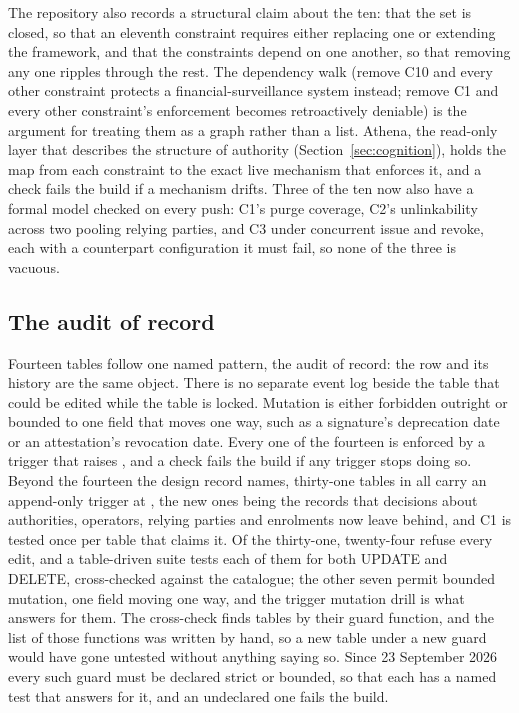 The repository also records a structural claim about the ten: that the set is closed, so that an
eleventh constraint requires either replacing one or extending the framework, and that the
constraints depend on one another, so that removing any one ripples through the rest. The
dependency walk (remove C10 and every other constraint protects a financial-surveillance system
instead; remove C1 and every other constraint's enforcement becomes retroactively deniable) is the
argument for treating them as a graph rather than a list. Athena, the read-only layer that describes the
structure of authority (Section~\ref{sec:cognition}), holds the map from each constraint to the exact live mechanism that enforces it, and a check fails
the build if a mechanism drifts. Three of the ten now also have a formal model checked on every push:
C1's purge coverage, C2's unlinkability across two pooling relying parties, and C3 under concurrent
issue and revoke, each with a counterpart configuration it must fail, so none of the three is vacuous.

\subsection{The audit of record}

Fourteen tables follow one named pattern, the audit of record: the row and its history are the same
object. There is no separate event log beside the table that could be edited while the table is
locked. Mutation is either forbidden outright or bounded to one field that moves one way, such as a
signature's deprecation date or an attestation's revocation date. Every one of the fourteen is
enforced by a trigger that raises , and a check fails the build if any
trigger stops doing so. Beyond the fourteen the design record names, thirty-one tables in all carry
an append-only trigger at , the new ones being the records that decisions about
authorities, operators, relying parties and enrolments now leave behind, and C1 is
tested once per table that claims it. Of the thirty-one, twenty-four refuse every edit, and a
table-driven suite tests each of them for both UPDATE and DELETE, cross-checked against the
catalogue; the other seven permit bounded mutation, one field moving one way, and the trigger
mutation drill is what answers for them. The cross-check finds tables by their guard function, and
the list of those functions was written by hand, so a new table under a new guard would have gone
untested without anything saying so. Since 23 September 2026 every such guard must be declared
strict or bounded, so that each has a named test that answers for it, and an undeclared one fails
the build. \sImpl

